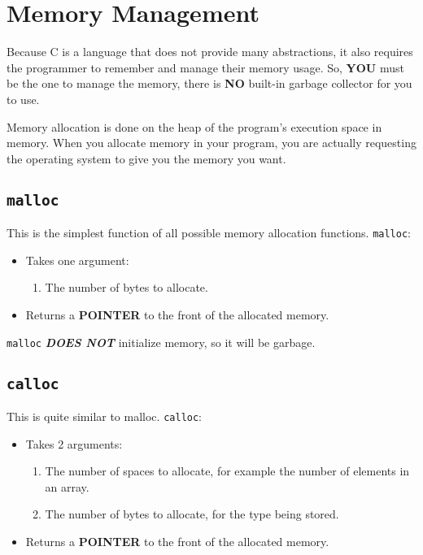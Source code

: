 \section{Memory Management}\label{sec:Memory_Management}
Because C is a language that does not provide many abstractions, it also requires the programmer to remember and manage their memory usage.
So, \textbf{YOU} must be the one to manage the memory, there is \textbf{NO} built-in garbage collector for you to use.

Memory allocation is done on the heap of the program's execution space in memory.
When you allocate memory in your program, you are actually requesting the operating system to give you the memory you want.

\subsection{\texttt{malloc}}\label{subsec:malloc}
This is the simplest function of all possible memory allocation functions.
\texttt{malloc}:
\begin{itemize}
\item Takes one argument:
  \begin{enumerate}
  \item The number of bytes to allocate.
  \end{enumerate}
\item Returns a \textbf{POINTER} to the front of the allocated memory.
\end{itemize}

\texttt{malloc} {\large{\textbf{\emph{DOES NOT}}}} initialize memory, so it will be garbage.

\subsection{\texttt{calloc}}\label{subsec:calloc}
This is quite similar to malloc.
\texttt{calloc}:
\begin{itemize}
\item Takes 2 arguments:
  \begin{enumerate}
  \item The number of spaces to allocate, for example the number of elements in an array.
  \item The number of bytes to allocate, for the type being stored.
  \end{enumerate}
\item Returns a \textbf{POINTER} to the front of the allocated memory.
\end{itemize}


